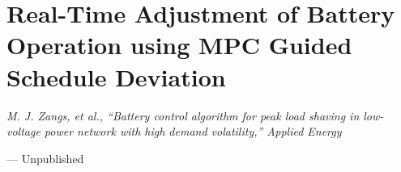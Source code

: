 \chapter{Real-Time Adjustment of Battery Operation using MPC Guided Schedule Deviation}
\label{ch2}

\singlespacing
\epigraph{\textit{M. J. Zangs, et al., ``Battery control algorithm for peak load shaving in low-voltage power network with high demand volatility,'' Applied Energy}}{--- Unpublished}
\doublespacing












